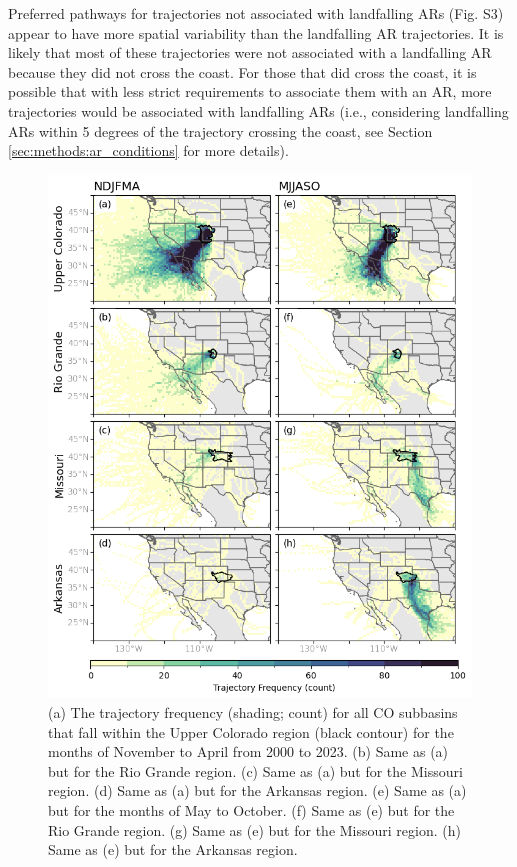 \documentclass[draft]{agujournal2019}
\begin{document}
Preferred pathways for trajectories not associated with landfalling ARs (Fig. S3) appear to have more spatial variability than the landfalling AR trajectories. It is likely that most of these trajectories were not associated with a landfalling AR because they did not cross the coast. For those that did cross the coast, it is possible that with less strict requirements to associate them with an AR, more trajectories would be associated with landfalling ARs (i.e., considering landfalling ARs within 5 degrees of the trajectory crossing the coast, see Section \ref{sec:methods:ar_conditions} for more details).


\begin{figure}
\noindent\includegraphics[width=\textwidth, height=\textheight, keepaspectratio]{fig5.png}
\caption{(a) The trajectory frequency (shading; count) for all CO subbasins that fall within the Upper Colorado region (black contour) for the months of November to April from 2000 to 2023. (b) Same as (a) but for the Rio Grande region. (c) Same as (a) but for the Missouri region. (d) Same as (a) but for the Arkansas region. (e) Same as (a) but for the months of May to October. (f) Same as (e) but for the Rio Grande region. (g) Same as (e) but for the Missouri region. (h) Same as (e) but for the Arkansas region.}
\label{fig:heatmaps}
\end{figure}
\end{document}
